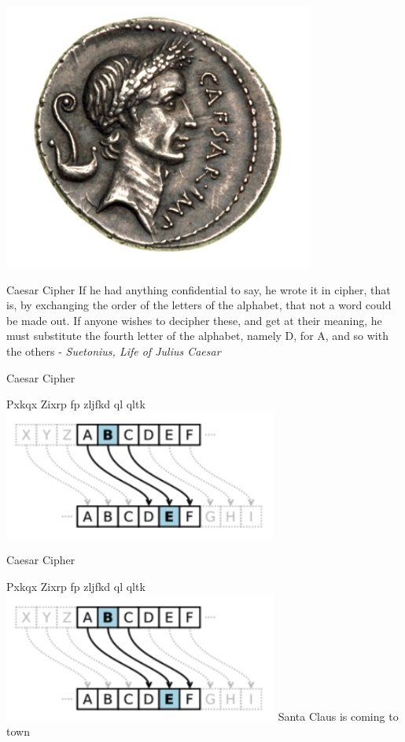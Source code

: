 \documentclass{beamer}
\begin{document}
\begin{frame}{}
\begin{center}
\includegraphics[width=0.7\linewidth]{coin.png}
\end{center}
\end{frame}

\begin{frame}{Caesar Cipher}
If he had anything confidential to say, he wrote it in cipher, that is, by exchanging the order of the letters of the alphabet, that not a word could be made out.  If anyone wishes to decipher these, and get at their meaning, he must substitute the fourth letter of the alphabet, namely D, for A, and so with the others - \textit{Suetonius, Life of Julius Caesar}
\end{frame}

\begin{frame}{Caesar Cipher}
\begin{center}
Pxkqx Zixrp fp zljfkd ql qltk \newline
\includegraphics[width=0.7\linewidth]{caesar-cipher.png}
\end{center}
\end{frame}

\begin{frame}{Caesar Cipher}
\begin{center}
Pxkqx Zixrp fp zljfkd ql qltk \newline
\includegraphics[width=0.7\linewidth]{caesar-cipher.png} \newline
Santa Claus is coming to town
\end{center}
\end{frame}
\end{document}
